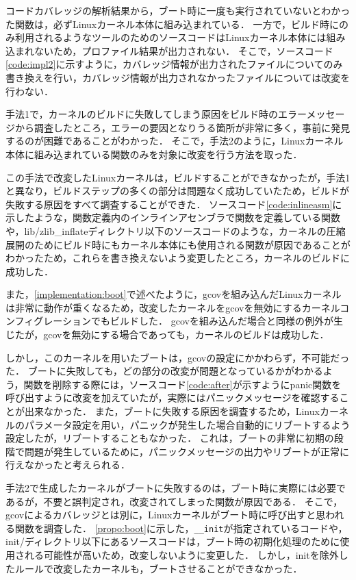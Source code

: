 \documentclass[graduation-thesis]{mlarticle}
\begin{document}
コードカバレッジの解析結果から，ブート時に一度も実行されていないとわかった関数は，必ずLinuxカーネル本体に組み込まれている．
一方で，ビルド時にのみ利用されるようなツールのためのソースコードはLinuxカーネル本体には組み込まれないため，プロファイル結果が出力されない．
そこで，ソースコード\ref{code:impl2}に示すように，カバレッジ情報が出力されたファイルについてのみ書き換えを行い，カバレッジ情報が出力されなかったファイルについては改変を行わない．

手法1で，カーネルのビルドに失敗してしまう原因をビルド時のエラーメッセージから調査したところ，エラーの要因となりうる箇所が非常に多く，事前に発見するのが困難であることがわかった．
そこで，手法2のように，Linuxカーネル本体に組み込まれている関数のみを対象に改変を行う方法を取った．

この手法で改変したLinuxカーネルは，ビルドすることができなかったが，手法1と異なり，ビルドステップの多くの部分は問題なく成功していたため，ビルドが失敗する原因をすべて調査することができた．
ソースコード\ref{code:inlineasm}に示したような，関数定義内のインラインアセンブラで関数を定義している関数や，lib/zlib\_inflateディレクトリ以下のソースコードのような，カーネルの圧縮展開のためにビルド時にもカーネル本体にも使用される関数が原因であることがわかったため，これらを書き換えないよう変更したところ，カーネルのビルドに成功した．

また，\ref{implementation:boot}で述べたように，gcovを組み込んだLinuxカーネルは非常に動作が重くなるため，改変したカーネルをgcovを無効にするカーネルコンフィグレーションでもビルドした．
gcovを組み込んだ場合と同様の例外が生じたが，gcovを無効にする場合であっても，カーネルのビルドは成功した．

しかし，このカーネルを用いたブートは，gcovの設定にかかわらず，不可能だった．
ブートに失敗しても，どの部分の改変が問題となっているかがわかるよう，関数を削除する際には，ソースコード\ref{code:after}が示すようにpanic関数を呼び出すように改変を加えていたが，実際にはパニックメッセージを確認することが出来なかった．
また，ブートに失敗する原因を調査するため，Linuxカーネルのパラメータ設定を用い，パニックが発生した場合自動的にリブートするよう設定したが，リブートすることもなかった．
これは，ブートの非常に初期の段階で問題が発生しているために，パニックメッセージの出力やリブートが正常に行えなかったと考えられる．

手法2で生成したカーネルがブートに失敗するのは，ブート時に実際には必要であるが，不要と誤判定され，改変されてしまった関数が原因である．
そこで，gcovによるカバレッジとは別に，Linuxカーネルがブート時に呼び出すと思われる関数を調査した．
\ref{propo:boot}に示した，\texttt{\_\_init}が指定されているコードや，init/ディレクトリ以下にあるソースコードは，ブート時の初期化処理のために使用される可能性が高いため，改変しないように変更した．
しかし，initを除外したルールで改変したカーネルも，ブートさせることができなかった．
\end{document}
